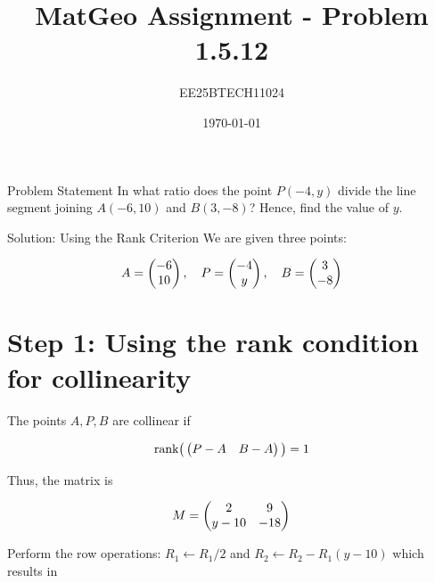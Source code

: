 \documentclass{beamer}
\title{MatGeo Assignment - Problem 1.5.12}
\author{EE25BTECH11024}
\institute{IIT Hyderabad}
\date{\today}
\begin{document}
\begin{frame}
  \titlepage
\end{frame}

\begin{frame}{Problem Statement}
In what ratio does the point $P(-4, y)$ divide the line segment joining 
$A(-6,10)$ and $B(3,-8)$? Hence, find the value of $y$.
\end{frame}

\begin{frame}{Solution: Using the Rank Criterion}
\noindent
We are given three points:

\begin{align}
A = \begin{pmatrix}-6 \\ 10\end{pmatrix}, \quad 
P = \begin{pmatrix}-4 \\ y\end{pmatrix}, \quad 
B = \begin{pmatrix}3 \\ -8\end{pmatrix}
\end{align}

\section*{Step 1: Using the rank condition for collinearity}

The points \(A, P, B\) are collinear if

\begin{align}
\text{rank}\big(\begin{pmatrix}P-A & B-A\end{pmatrix}\big) = 1
\end{align}

Thus, the matrix is

\begin{align}
M = \begin{pmatrix}2 & 9 \\ y-10 & -18\end{pmatrix}
\end{align}

Perform the row operations: $R_1 \leftarrow R_1/2$ and $R_2 \leftarrow R_2 - R_1(y-10)$  which results in

\end{frame}
\end{document}
